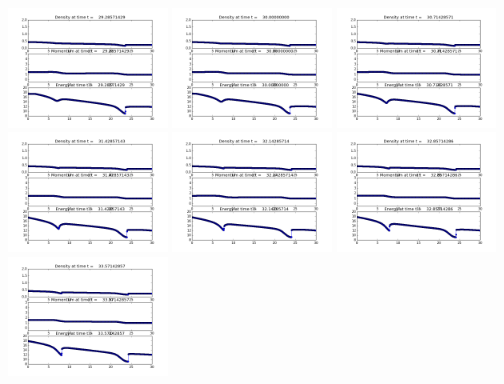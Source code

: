 \documentclass[11pt]{article}
\begin{document}
\vskip 10pt 
\includegraphics[width=0.316666666667\textwidth]{frame0041fig1.png}
\vskip 10pt 
\includegraphics[width=0.316666666667\textwidth]{frame0042fig1.png}
\vskip 10pt 
\includegraphics[width=0.316666666667\textwidth]{frame0043fig1.png}
\vskip 10pt 
\includegraphics[width=0.316666666667\textwidth]{frame0044fig1.png}
\vskip 10pt 
\includegraphics[width=0.316666666667\textwidth]{frame0045fig1.png}
\vskip 10pt 
\includegraphics[width=0.316666666667\textwidth]{frame0046fig1.png}
\vskip 10pt 
\includegraphics[width=0.316666666667\textwidth]{frame0047fig1.png}
\end{document}
